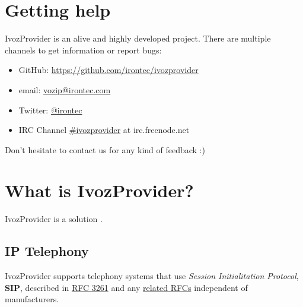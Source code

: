 \documentclass[letterpaper,10pt,english]{sphinxmanual}
\begin{document}
\section{Getting help}
\label{basics/intro/getting_help:getting-help}\label{basics/intro/getting_help::doc}\label{basics/intro/getting_help:id1}
IvozProvider is an alive and highly developed project. There are
multiple channels to get information or report bugs:
\begin{itemize}
\item {} 
GitHub: \url{https://github.com/irontec/ivozprovider}

\item {} 
email: \href{mailto:vozip@irontec.com}{vozip@irontec.com}

\item {} 
Twitter: \href{https://twitter.com/irontec}{@irontec}

\item {} 
IRC Channel \href{https://webchat.freenode.net/?channels=ivozprovider}{\#ivozprovider} at irc.freenode.net

\end{itemize}

Don't hesitate to contact us for any kind of feedback :)


\section{What is IvozProvider?}
\label{basics/intro/what_is_ivozprovider::doc}\label{basics/intro/what_is_ivozprovider:what-is-ivozprovider}
IvozProvider is a {\hyperref[basics/intro/what_is_ivozprovider:operator\string-oriented]{}}
{\hyperref[basics/intro/what_is_ivozprovider:multilevel]{}} {\hyperref[basics/intro/what_is_ivozprovider:voip]{}} solution
{\hyperref[basics/intro/what_is_ivozprovider:exposed]{}}.


\subsection{IP Telephony}
\label{basics/intro/what_is_ivozprovider:ip-telephony}\label{basics/intro/what_is_ivozprovider:voip}
IvozProvider supports telephony systems that use \emph{Session Initialitation
Protocol}, \textbf{SIP}, described in \href{https://tools.ietf.org/html/rfc3261}{RFC 3261} and any \href{https://www.packetizer.com/ipmc/sip/standards.html}{related RFCs} independent of
manufacturers.
\end{document}
